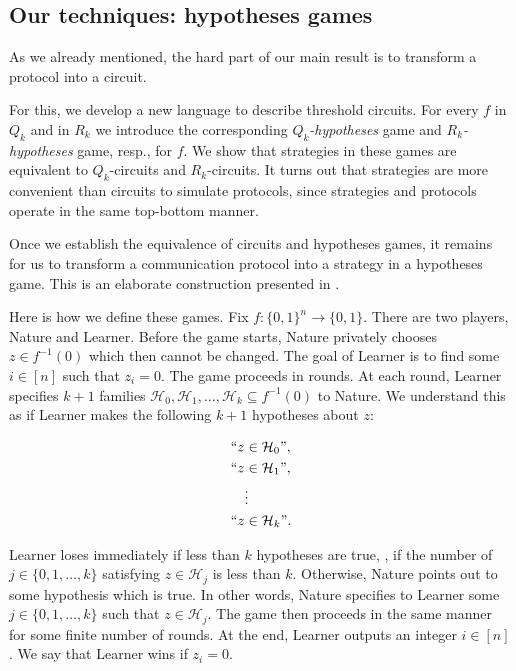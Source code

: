 \subsection{Our techniques: hypotheses games}

As we already mentioned, the hard part of our main result is to transform a protocol into a circuit. 



For this, we develop a new language to describe threshold circuits.
%
For  %
every $f$ in $Q_k$ %
and in $R_k$   %
we introduce the corresponding \emph{$Q_k$-hypotheses}
%
game and  \emph{$R_k$-hypotheses} game, resp.,  %
for $f$. We show that strategies in these games are equivalent to $Q_k$-circuits and $R_k$-circuits.
It turns out that strategies are more convenient than circuits to simulate protocols, since strategies and protocols operate in the same top-bottom manner.

Once we establish the equivalence of circuits and hypotheses games, it remains for us to transform a communication protocol into a strategy in a hypotheses game. This is an elaborate construction presented in  . %



Here is how we define these games. Fix $f\colon\{0, 1\}^n \to \{0, 1\}$. There are two players, Nature and Learner. Before the game starts, Nature privately chooses $z\in f^{-1}(0)$ which then cannot be changed. The goal of Learner is to find some $i\in [n]$ such that $z_i = 0$. The game proceeds in rounds. At each round, Learner specifies $k + 1$ families $\mathcal{H}_0, \mathcal{H}_1, \ldots, \mathcal{H}_{k} \subseteq f^{-1}(0)$ to Nature. We understand this as if Learner makes the following $k + 1$ hypotheses about $z$:

\begin{align*}
``z&\in\mathcal{H}_0\mbox{''}, \\
``z&\in\mathcal{H}_1\mbox{''}, \\
&\vdots \\
``z&\in\mathcal{H}_{k}\mbox{''}.
\end{align*}

Learner loses immediately if less than $k$ hypotheses are true, \ie, if the number of $j\in\{0, 1, \ldots, k\}$ satisfying $z\in\mathcal{H}_j$ is less than $k$. Otherwise, Nature points out to some hypothesis which is true. In other words, Nature specifies to Learner some $j\in \{0, 1, \ldots, k\}$ such that $z\in \mathcal{H}_j$. The game then proceeds in the same manner for some finite number of rounds. At the end, Learner outputs an integer $i\in [n]$. We say that Learner wins if  $z_i = 0$.

